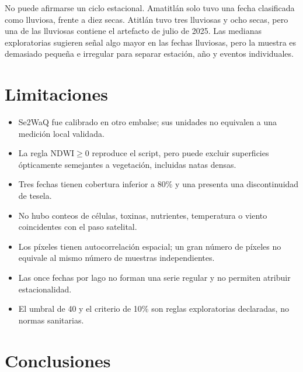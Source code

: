 \documentclass[11pt,letterpaper]{article}
\begin{document}
No puede afirmarse un ciclo estacional. Amatitlán solo tuvo una fecha clasificada como lluviosa, frente a diez secas. Atitlán tuvo tres lluviosas y ocho secas, pero una de las lluviosas contiene el artefacto de julio de 2025. Las medianas exploratorias sugieren señal algo mayor en las fechas lluviosas, pero la muestra es demasiado pequeña e irregular para separar estación, año y eventos individuales.

\section{Limitaciones}

\begin{itemize}
\item Se2WaQ fue calibrado en otro embalse; sus unidades no equivalen a una medición local validada.
\item La regla $\mathrm{NDWI}\geq0$ reproduce el script, pero puede excluir superficies ópticamente semejantes a vegetación, incluidas natas densas.
\item Tres fechas tienen cobertura inferior a 80\% y una presenta una discontinuidad de tesela.
\item No hubo conteos de células, toxinas, nutrientes, temperatura o viento coincidentes con el paso satelital.
\item Los píxeles tienen autocorrelación espacial; un gran número de píxeles no equivale al mismo número de muestras independientes.
\item Las once fechas por lago no forman una serie regular y no permiten atribuir estacionalidad.
\item El umbral de 40 y el criterio de 10\% son reglas exploratorias declaradas, no normas sanitarias.
\end{itemize}

\section{Conclusiones}
\end{document}
